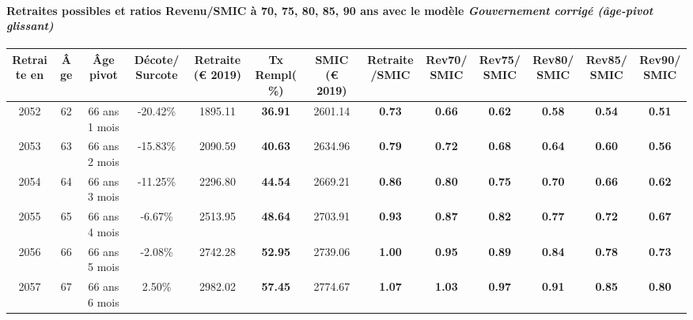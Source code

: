 \paragraph{Retraites possibles et ratios Revenu/SMIC à 70, 75, 80, 85, 90 ans avec le modèle \emph{Gouvernement corrigé (âge-pivot glissant)}}  
 
{ \scriptsize \begin{center} 
\begin{tabular}[htb]{|c|c||c|c||c|c||c||c|c|c|c|c|c|} 
\hline 
 Retraite en &  Âge &  Âge pivot &  Décote/Surcote &  Retraite (\euro{} 2019) &  Tx Rempl(\%) &  SMIC (\euro{} 2019) &  Retraite/SMIC &  Rev70/SMIC &  Rev75/SMIC &  Rev80/SMIC &  Rev85/SMIC &  Rev90/SMIC \\ 
\hline \hline 
 2052 &  62 &  66 ans 1 mois &  -20.42\% &  1895.11 &  {\bf 36.91} &  2601.14 &  {\bf {\color{red} 0.73}} &  {\bf {\color{red} 0.66}} &  {\bf {\color{red} 0.62}} &  {\bf {\color{red} 0.58}} &  {\bf {\color{red} 0.54}} &  {\bf {\color{red} 0.51}} \\ 
\hline 
 2053 &  63 &  66 ans 2 mois &  -15.83\% &  2090.59 &  {\bf 40.63} &  2634.96 &  {\bf {\color{red} 0.79}} &  {\bf {\color{red} 0.72}} &  {\bf {\color{red} 0.68}} &  {\bf {\color{red} 0.64}} &  {\bf {\color{red} 0.60}} &  {\bf {\color{red} 0.56}} \\ 
\hline 
 2054 &  64 &  66 ans 3 mois &  -11.25\% &  2296.80 &  {\bf 44.54} &  2669.21 &  {\bf {\color{red} 0.86}} &  {\bf {\color{red} 0.80}} &  {\bf {\color{red} 0.75}} &  {\bf {\color{red} 0.70}} &  {\bf {\color{red} 0.66}} &  {\bf {\color{red} 0.62}} \\ 
\hline 
 2055 &  65 &  66 ans 4 mois &  -6.67\% &  2513.95 &  {\bf 48.64} &  2703.91 &  {\bf {\color{red} 0.93}} &  {\bf {\color{red} 0.87}} &  {\bf {\color{red} 0.82}} &  {\bf {\color{red} 0.77}} &  {\bf {\color{red} 0.72}} &  {\bf {\color{red} 0.67}} \\ 
\hline 
 2056 &  66 &  66 ans 5 mois &  -2.08\% &  2742.28 &  {\bf 52.95} &  2739.06 &  {\bf 1.00} &  {\bf {\color{red} 0.95}} &  {\bf {\color{red} 0.89}} &  {\bf {\color{red} 0.84}} &  {\bf {\color{red} 0.78}} &  {\bf {\color{red} 0.73}} \\ 
\hline 
 2057 &  67 &  66 ans 6 mois &  2.50\% &  2982.02 &  {\bf 57.45} &  2774.67 &  {\bf 1.07} &  {\bf 1.03} &  {\bf {\color{red} 0.97}} &  {\bf {\color{red} 0.91}} &  {\bf {\color{red} 0.85}} &  {\bf {\color{red} 0.80}} \\ 
\hline 
\hline 
\end{tabular} 
\end{center} } 
